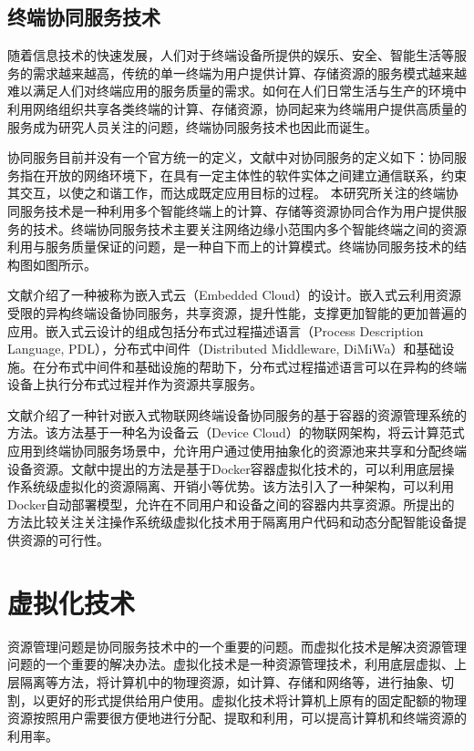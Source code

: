 \subsection{终端协同服务技术}
随着信息技术的快速发展，人们对于终端设备所提供的娱乐、安全、智能生活等服务的需求越来越高，传统的单一终端为用户提供计算、存储资源的服务模式越来越难以满足人们对终端应用的服务质量的需求。如何在人们日常生活与生产的环境中利用网络组织共享各类终端的计算、存储资源，协同起来为终端用户提供高质量的服务成为研究人员关注的问题，终端协同服务技术也因此而诞生。


协同服务目前并没有一个官方统一的定义，文献\cite{张静乐2011协同服务}中对协同服务的定义如下：协同服务指在开放的网络环境下，在具有一定主体性的软件实体之间建立通信联系，约束其交互，以使之和谐工作，而达成既定应用目标的过程。
本研究所关注的终端协同服务技术是一种利用多个智能终端上的计算、存储等资源协同合作为用户提供服务的技术。终端协同服务技术主要关注网络边缘小范围内多个智能终端之间的资源利用与服务质量保证的问题，是一种自下而上的计算模式。终端协同服务技术的结构图如图所示。

文献\cite{laukkarinen2013embedded}介绍了一种被称为嵌入式云（Embedded Cloud）的设计。嵌入式云利用资源受限的异构终端设备协同服务，共享资源，提升性能，支撑更加智能的更加普遍的应用。嵌入式云设计的组成包括分布式过程描述语言（Process Description Language, PDL），分布式中间件（Distributed Middleware, DiMiWa）和基础设施。在分布式中间件和基础设施的帮助下，分布式过程描述语言可以在异构的终端设备上执行分布式过程并作为资源共享服务。

文献\cite{renner2016towards}介绍了一种针对嵌入式物联网终端设备协同服务的基于容器的资源管理系统的方法。该方法基于一种名为设备云（Device Cloud）的物联网架构，将云计算范式应用到终端协同服务场景中，允许用户通过使用抽象化的资源池来共享和分配终端设备资源。文献中提出的方法是基于Docker容器虚拟化技术的，可以利用底层操作系统级虚拟化的资源隔离、开销小等优势。该方法引入了一种架构，可以利用Docker自动部署模型，允许在不同用户和设备之间的容器内共享资源。所提出的方法比较关注关注操作系统级虚拟化技术用于隔离用户代码和动态分配智能设备提供资源的可行性。



\section{虚拟化技术}\label{sec:related_work_virtualization}
资源管理问题是协同服务技术中的一个重要的问题\citep{文雨2013面向应用服务级目标的虚拟化资源管理}。而虚拟化技术是解决资源管理问题的一个重要的解决办法。虚拟化技术是一种资源管理技术，利用底层虚拟、上层隔离等方法，将计算机中的物理资源，如计算、存储和网络等，进行抽象、切割，以更好的形式提供给用户使用\cite{goth2007virtualization}。虚拟化技术将计算机上原有的固定配额的物理资源按照用户需要很方便地进行分配、提取和利用，可以提高计算机和终端资源的利用率。

